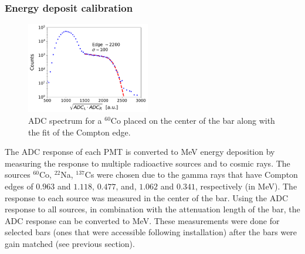 \documentclass[3p,final,twocolumn]{elsarticle}
\begin{document}
\subsubsection{Energy deposit calibration}
\label{sec:energydeposit}
\begin{figure}[tbh]
	\centering
		\includegraphics[width=0.48\textwidth]{cobaltfit.pdf}
		\caption{ADC spectrum for a $^{60}$Co placed on the center of the bar along with the fit of the Compton edge.}
	\label{fig:compton_edge}
\end{figure}


The ADC response of each PMT is converted to \si{\mega\electronvolt}
energy deposition by measuring the response to multiple radioactive
sources and to cosmic rays. The sources $^{60}$Co, $^{22}$Na, $^{137}$Cs were chosen due
to the gamma rays that have Compton edges of $0.963$ and $1.118$,
$0.477$, and, $1.062$ and $0.341$, respectively (in
\si{\mega\electronvolt}). The response to each source was measured in
the center of the bar. Using the ADC response to all sources, in
combination with the attenuation length of the bar, the ADC response
can be converted to \si{\mega\electronvolt}. These measurements were
done for selected bars (ones that were accessible following
installation) after the bars were gain matched (see previous section).
\end{document}
